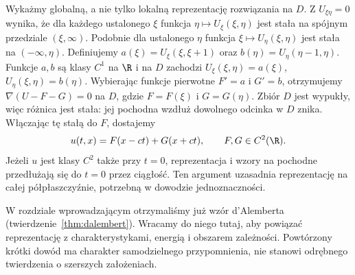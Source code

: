 Wykażmy globalną, a nie tylko lokalną reprezentację
rozwiązania na $D$. Z $U_{\xi\eta}=0$ wynika, że
dla każdego ustalonego $\xi$ funkcja
$\eta\mapsto U_\xi(\xi,\eta)$ jest stała na spójnym
przedziale $(\xi,\infty)$. Podobnie dla ustalonego
$\eta$ funkcja $\xi\mapsto U_\eta(\xi,\eta)$
jest stała na $(-\infty,\eta)$.
Definiujemy $a(\xi)=U_\xi(\xi,\xi+1)$ oraz
$b(\eta)=U_\eta(\eta-1,\eta)$. Funkcje $a,b$
są klasy $C^1$ na $\R$ i na $D$ zachodzi
$U_\xi(\xi,\eta)=a(\xi)$, $U_\eta(\xi,\eta)=b(\eta)$.
Wybierając funkcje pierwotne $F'=a$ i $G'=b$,
otrzymujemy $\nabla(U-F-G)=0$ na $D$, gdzie
$F=F(\xi)$ i $G=G(\eta)$. Zbiór $D$ jest wypukły,
więc różnica jest stała: jej pochodna wzdłuż
dowolnego odcinka w $D$ znika.
Włączając tę stałą do $F$, dostajemy
\[
 u(t,x)=F(x-ct)+G(x+ct),\qquad F,G\in C^2(\R).
\]
Jeżeli $u$ jest klasy $C^2$ także przy $t=0$,
reprezentacja i wzory na pochodne przedłużają się
do $t=0$ przez ciągłość. Ten argument uzasadnia
reprezentację na całej półpłaszczyźnie, potrzebną
w dowodzie jednoznaczności.

W rozdziale wprowadzającym otrzymaliśmy już wzór d'Alemberta
(twierdzenie~\ref{thm:dalembert}). Wracamy do niego tutaj,
aby powiązać reprezentację z charakterystykami, energią i
obszarem zależności. Powtórzony krótki dowód ma charakter
samodzielnego przypomnienia, nie stanowi odrębnego twierdzenia
o szerszych założeniach.

